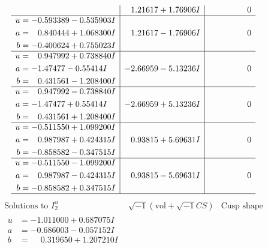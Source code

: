 \documentclass[1p]{elsarticle_modified}
\theoremstyle{definition}
\newcommand{\I}{\sqrt{-1}}
\begin{document}
$$\begin{array}{c|c|c}
 & \phantom{-}1.21617 + 1.76906 I & \phantom{-0.000000 } 0 \\ \hline\begin{aligned}
u &= -0.593389 - 0.535903 I \\
a &= \phantom{-}0.840444 + 1.068300 I \\
b &= -0.400624 + 0.755023 I\end{aligned}
 & \phantom{-}1.21617 - 1.76906 I & \phantom{-0.000000 } 0 \\ \hline\begin{aligned}
u &= \phantom{-}0.947992 + 0.738840 I \\
a &= -1.47477 - 0.55414 I \\
b &= \phantom{-}0.431561 - 1.208400 I\end{aligned}
 & -2.66959 - 5.13236 I & \phantom{-0.000000 } 0 \\ \hline\begin{aligned}
u &= \phantom{-}0.947992 - 0.738840 I \\
a &= -1.47477 + 0.55414 I \\
b &= \phantom{-}0.431561 + 1.208400 I\end{aligned}
 & -2.66959 + 5.13236 I & \phantom{-0.000000 } 0 \\ \hline\begin{aligned}
u &= -0.511550 + 1.099200 I \\
a &= \phantom{-}0.987987 + 0.424315 I \\
b &= -0.858582 - 0.347515 I\end{aligned}
 & \phantom{-}0.93815 + 5.69631 I & \phantom{-0.000000 } 0 \\ \hline\begin{aligned}
u &= -0.511550 - 1.099200 I \\
a &= \phantom{-}0.987987 - 0.424315 I \\
b &= -0.858582 + 0.347515 I\end{aligned}
 & \phantom{-}0.93815 - 5.69631 I & \phantom{-0.000000 } 0\\
 \hline 
 \end{array}$$\newpage$$\begin{array}{c|c|c}  
\text{Solutions to }I^u_{2}& \I (\text{vol} + \sqrt{-1}CS) & \text{Cusp shape}\\
 \hline 
\begin{aligned}
u &= -1.011000 + 0.687075 I \\
a &= -0.686003 - 0.057152 I \\
b &= \phantom{-}0.319650 + 1.207210 I\end{aligned}

\end{array}$$
\end{document}
